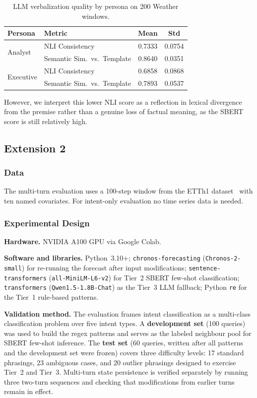 \documentclass[conference]{IEEEtran}
\begin{document}
\begin{table}[h]
\centering
\caption{LLM verbalization quality by persona on 200 Weather windows.}
\label{tab:verbalization}
\begin{tabular}{llcc}
\toprule
Persona & Metric & Mean & Std \\
\midrule
\multirow{2}{*}{Analyst}
  & NLI Consistency              & 0.7333 & 0.0754 \\
  & Semantic Sim.\ vs.\ Template & 0.8640 & 0.0351 \\
\midrule
\multirow{2}{*}{Executive}
  & NLI Consistency              & 0.6858 & 0.0868 \\
  & Semantic Sim.\ vs.\ Template & 0.7893 & 0.0537 \\
\bottomrule
\end{tabular}
\end{table}

However, we interpret this lower NLI score as a reflection in lexical divergence from the premise rather than a genuine loss of factual meaning, as the SBERT score is still relatively high.

\subsection{Extension 2}

\subsubsection{Data}

The multi-turn evaluation uses a 100-step window from the ETTh1 dataset~\cite{zhou2021informer} with ten named covariates. For intent-only evaluation no time series data is needed.

\subsubsection{Experimental Design}

\textbf{Hardware.} NVIDIA A100 GPU via Google Colab.

\textbf{Software and libraries.} Python~3.10+; \texttt{chronos-forecasting} (\texttt{Chronos-2-small}) for re-running the forecast after input modifications; \texttt{sentence-transformers} (\texttt{all-MiniLM-L6-v2}) for Tier~2 SBERT few-shot classification; \texttt{transformers} (\texttt{Qwen1.5-1.8B-Chat}) as the Tier~3 LLM fallback; Python \texttt{re} for the Tier~1 rule-based patterns.

\textbf{Validation method.}
The evaluation frames intent classification as a multi-class classification problem over five intent types. A \textbf{development set} (100 queries) was used to build the regex patterns and serves as the labeled neighbour pool for SBERT few-shot inference. The \textbf{test set} (60 queries, written after all patterns and the development set were frozen) covers three difficulty levels: 17 standard phrasings, 23 ambiguous cases, and 20 outlier phrasings designed to exercise Tier~2 and Tier~3. Multi-turn state persistence is verified separately by running three two-turn sequences and checking that modifications from earlier turns remain in effect.
\end{document}
